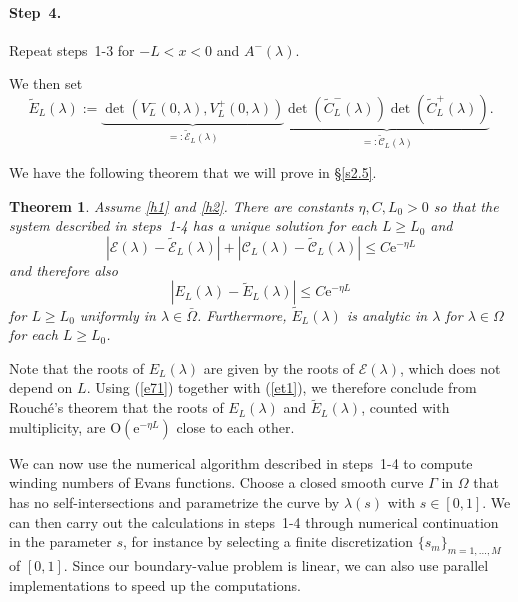 \documentclass[10pt]{article}
\newtheorem{Theorem}{Theorem}
\numberwithin{equation}{section}
\newcommand{\rme}{\mathrm{e}}
\newcommand{\rmO}{\mathrm{O}}
\begin{document}
\paragraph{Step~4.} Repeat steps~1-3 for $-L<x<0$ and $A^-(\lambda)$.

We then set
\begin{equation}\label{23}
\tilde{E}_L(\lambda) := \underbrace{\det(V^-_L(0,\lambda),V^+_L(0,\lambda))}_{=:\tilde{\mathcal{E}}_L(\lambda)} \underbrace{\det(\tilde{C}^-_L(\lambda)) \det(\tilde{C}^+_L(\lambda))}_{=:\tilde{\mathcal{C}}_L(\lambda)}.
\end{equation}

We have the following theorem that we will prove in \S\ref{s2.5}.

\begin{Theorem}\label{t1}
Assume \ref{h1} and \ref{h2}. There are constants $\eta,C,L_0>0$ so that the system described in steps~1-4 has a unique solution for each $L\geq L_0$ and
\begin{equation}\label{et1}
|\mathcal{E}(\lambda) - \tilde{\mathcal{E}}_L(\lambda)| + |\mathcal{C}_L(\lambda) - \tilde{\mathcal{C}}_L(\lambda)|\leq C \rme^{-\eta L}
\end{equation}
and therefore also
\begin{equation}\label{et2}
|E_L(\lambda) - \tilde{E}_L(\lambda)| \leq C \rme^{-\eta L}
\end{equation}
for $L\geq L_0$ uniformly in $\lambda\in\bar\Omega$. Furthermore, $\tilde{E}_L(\lambda)$ is analytic in $\lambda$ for $\lambda\in\Omega$ for each $L\geq L_0$.
\end{Theorem}

Note that the roots of $E_L(\lambda)$ are given by the roots of $\mathcal{E}(\lambda)$, which does not depend on $L$. Using (\ref{e71}) together with (\ref{et1}), we therefore conclude from Rouch\'{e}'s theorem that the roots of $E_L(\lambda)$ and $\tilde{E}_L(\lambda)$, counted with multiplicity, are $\rmO(\rme^{-\eta L})$ close to each other.

We can now use the numerical algorithm described in steps~1-4 to compute winding numbers of Evans functions. Choose a closed smooth curve $\Gamma$ in $\Omega$ that has no self-intersections and parametrize the curve by $\lambda(s)$ with $s\in[0,1]$. We can then carry out the calculations in steps~1-4 through numerical continuation in the parameter $s$, for instance by selecting a finite discretization $\{s_m\}_{m=1,\ldots,M}$ of $[0,1]$. Since our boundary-value problem is linear, we can also use parallel implementations to speed up the computations.
\end{document}
